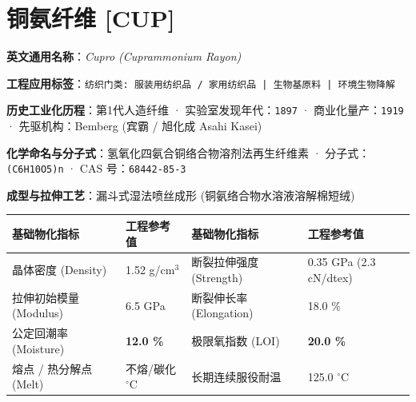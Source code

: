 \documentclass[11pt,openright,twoside,UTF8]{ctexbook}
\begin{document}
\section{铜氨纤维 [CUP]}
\label{sec:cup}

\noindent\textbf{英文通用名称}：\textit{Cupro (Cuprammonium Rayon)}\par
\noindent\textbf{工程应用标签}：\texttt{纺织门类: 服装用纺织品 / 家用纺织品 | 生物基原料 | 环境生物降解}\par
\noindent\textbf{历史工业化历程}：第1代人造纤维 · 实验室发现年代：\texttt{1897} · 商业化量产：\texttt{1919} · 先驱机构：Bemberg (宾霸 / 旭化成 Asahi Kasei)\par
\noindent\textbf{化学命名与分子式}：氢氧化四氨合铜络合物溶剂法再生纤维素 · 分子式：\texttt{(C6H10O5)n} · CAS 号：\texttt{68442-85-3}\par
\noindent\textbf{成型与拉伸工艺}：漏斗式湿法喷丝成形 (铜氨络合物水溶液溶解棉短绒)\par

\vspace{0.15cm}
\begin{center}
\small
\begin{tabularx}{\textwidth}{p{3.8cm}Xp{3.8cm}X}
\toprule
\textbf{基础物化指标} & \textbf{工程参考值} & \textbf{基础物化指标} & \textbf{工程参考值} \\
\midrule
晶体密度 (Density) & 1.52 g/cm$^3$ & 断裂拉伸强度 (Strength) & 0.35 GPa (2.3 cN/dtex) \\
拉伸初始模量 (Modulus) & 6.5 GPa & 断裂伸长率 (Elongation) & 18.0 \% \\
公定回潮率 (Moisture) & \textbf{12.0 \%} & 极限氧指数 (LOI) & \textbf{20.0 \%} \\
熔点 / 热分解点 (Melt) & 不熔/碳化 $^\circ\mathrm{C}$ & 长期连续服役耐温 & 125.0 $^\circ\mathrm{C}$ \\
\bottomrule
\end{tabularx}
\end{center}
\vspace{0.15cm}
\end{document}
